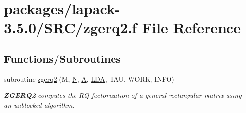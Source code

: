 \hypertarget{zgerq2_8f}{}\section{packages/lapack-\/3.5.0/\+S\+R\+C/zgerq2.f File Reference}
\label{zgerq2_8f}
\subsection*{Functions/\+Subroutines}
\begin{DoxyCompactItemize}
\item 
subroutine \hyperlink{group__complex16GEcomputational_ga858d2144c2b5c76ed8a5340fcf793a83}{zgerq2} (M, \hyperlink{polmisc_8c_a0240ac851181b84ac374872dc5434ee4}{N}, \hyperlink{classA}{A}, \hyperlink{example__user_8c_ae946da542ce0db94dced19b2ecefd1aa}{L\+D\+A}, T\+A\+U, W\+O\+R\+K, I\+N\+F\+O)
\begin{DoxyCompactList}\small\item\em {\bfseries Z\+G\+E\+R\+Q2} computes the R\+Q factorization of a general rectangular matrix using an unblocked algorithm. \end{DoxyCompactList}\end{DoxyCompactItemize}
